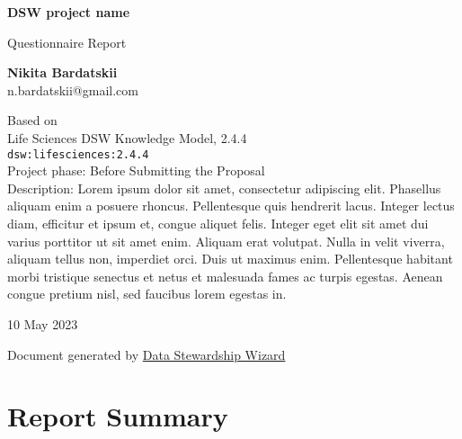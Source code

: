 \documentclass[a4paper,12pt]{report}
\begin{document}
\begin{titlepage}
    \begin{center}
        \vspace*{1cm}

        \Huge
        \textbf{DSW project name}

        \vspace{0.5cm}
        \LARGE
        Questionnaire Report

        \vspace{1.5cm}
        \Large
        \textbf{Nikita Bardatskii}\\
        n.bardatskii@gmail.com
        \vspace{1.5cm}

        \normalsize
        Based on\\
        Life Sciences DSW Knowledge Model, 2.4.4\\
        \texttt{dsw:lifesciences:2.4.4}\\
        \vspace{0.5cm}
        Project phase: Before Submitting the Proposal\\
        \vspace{0.25cm}
        Description: Lorem ipsum dolor sit amet, consectetur adipiscing elit. Phasellus aliquam enim a posuere rhoncus. Pellentesque quis hendrerit lacus. Integer lectus diam, efficitur et ipsum et, congue aliquet felis. Integer eget elit sit amet dui varius porttitor ut sit amet enim. Aliquam erat volutpat. Nulla in velit viverra, aliquam tellus non, imperdiet orci. Duis ut maximus enim. Pellentesque habitant morbi tristique senectus et netus et malesuada fames ac turpis egestas. Aenean congue pretium nisl, sed faucibus lorem egestas in.\\

        \vfill

        \Large
        {10 May 2023}

        \vspace{0.8cm}

        \normalsize
        Document generated by \href{https://ds-wizard.org}{Data Stewardship Wizard}
    \end{center}
\end{titlepage}

\chapter*{Report Summary}
\end{document}
